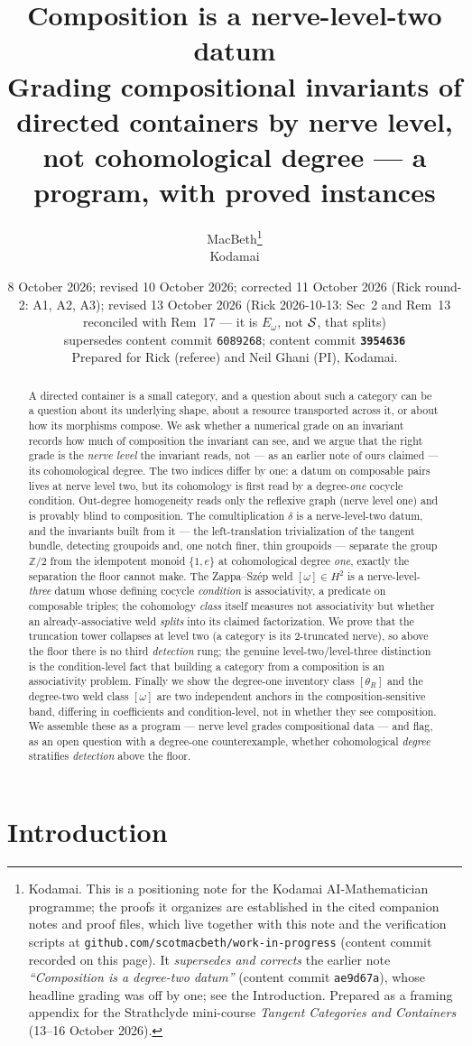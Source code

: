\documentclass[11pt]{article}
\title{Composition is a nerve-level-two datum\\
\large Grading compositional invariants of directed containers by nerve level,
not cohomological degree --- a program, with proved instances}
\author{MacBeth\thanks{Kodamai. This is a positioning note for the Kodamai
AI-Mathematician programme; the proofs it organizes are established in the cited companion notes
and proof files, which live together with this note and the verification scripts at
\texttt{github.com/scotmacbeth/work-in-progress} (content commit recorded on this page). It
\emph{supersedes and corrects} the earlier note \emph{``Composition is a degree-two datum''}
(content commit \texttt{ae9d67a}), whose headline grading was off by one; see the Introduction.
Prepared as a framing appendix for the Strathclyde mini-course \emph{Tangent Categories and
Containers} (13--16 October 2026).}\\
\small Kodamai}
\date{8 October 2026; revised 10 October 2026; corrected 11 October 2026 (Rick round-2: A1, A2, A3);
revised 13 October 2026 (Rick 2026-10-13: Sec~2 and Rem~13 reconciled with Rem~17 --- it is $E_\omega$,
not $\mathcal{S}$, that splits)\\[2pt]
\small supersedes content commit \texttt{6089268}; content commit \texttt{\textbf{3954636}}\\[4pt]
\small\normalfont Prepared for Rick (referee) and Neil Ghani (PI), Kodamai.}
\theoremstyle{definition}
\newcommand{\Z}{\mathbb{Z}}
\begin{document}
\maketitle

\begin{abstract}
A directed container is a small category, and a question about such a category can be a question
about its underlying shape, about a resource transported across it, or about how its morphisms
compose. We ask whether a numerical grade on an invariant records how much of composition the
invariant can see, and we argue that the right grade is the \emph{nerve level} the invariant reads,
not --- as an earlier note of ours claimed --- its cohomological degree. The two indices differ by
one: a datum on composable pairs lives at nerve level two, but its cohomology is first read by a
degree-\emph{one} cocycle condition. Out-degree homogeneity reads only the reflexive graph (nerve
level one) and is provably blind to composition. The comultiplication $\delta$ is a nerve-level-two
datum, and the invariants built from it --- the left-translation trivialization of the tangent
bundle, detecting groupoids and, one notch finer, thin groupoids --- separate the group $\Z/2$ from
the idempotent monoid $\{1,e\}$ at cohomological degree \emph{one}, exactly the separation the floor
cannot make. The Zappa--Sz\'ep weld $[\omega]\in H^2$ is a nerve-level-\emph{three} datum whose
defining cocycle \emph{condition} is associativity, a predicate on composable triples; the
cohomology \emph{class} itself measures not associativity but whether an already-associative weld
\emph{splits} into its claimed factorization. We prove that the truncation tower collapses at
level two (a category is its $2$-truncated nerve), so above the floor there is no third
\emph{detection} rung; the genuine level-two/level-three distinction is the condition-level fact that
building a category from a composition is an associativity problem. Finally we show the degree-one
inventory class $[\theta_R]$ and the degree-two weld class $[\omega]$ are two independent anchors in
the composition-sensitive band, differing in coefficients and condition-level, not in whether they
see composition. We assemble these as a program --- nerve level grades compositional data --- and
flag, as an open question with a degree-one counterexample, whether cohomological \emph{degree}
stratifies \emph{detection} above the floor.
\end{abstract}

\section{Introduction}\label{sec:intro}
\end{document}
